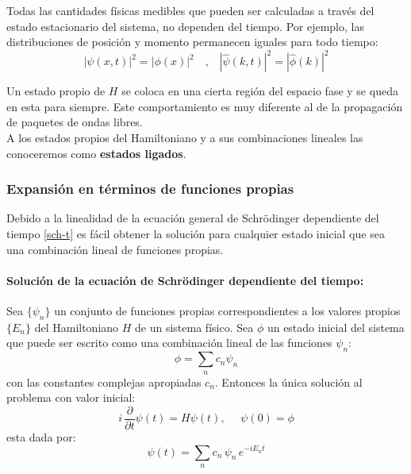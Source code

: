 \documentclass[12pt]{book}
\numberwithin{equation}{chapter}
\begin{document}
\vspace{5 mm}    

Todas las cantidades f\'isicas medibles que pueden ser calculadas a trav\'es del estado estacionario del sistema, no dependen del tiempo. Por ejemplo, las distribuciones de posici\'on y momento permanecen iguales para todo tiempo:
\begin{equation}
|\psi (x,t)|^{2}= |\phi (x)|^{2}  \,\,\,\,\,\,,\,\,\,\,\, |\hat{\psi} (k,t)|^{2}= |\hat{\phi}(k)|^{2}
\end{equation}

Un estado propio de $H$ se coloca en una cierta regi\'on del espacio fase y se queda en esta para siempre. Este comportamiento es muy diferente al de la propagaci\'on de paquetes de ondas libres.\\
A los estados propios del Hamiltoniano y a sus combinaciones lineales las conoceremos como {\bf estados ligados}.

\subsubsection{Expansi\'on en t\'erminos de funciones propias}
Debido a la linealidad de la ecuaci\'on general de Schr\"odinger dependiente del tiempo \eqref{sch-t} es f\'acil obtener la soluci\'on para cualquier estado inicial que sea una combinaci\'on lineal de funciones propias.

\paragraph{Soluci\'on de la ecuaci\'on de Schr\"odinger dependiente del tiempo:}  
Sea $\{ \psi_{n} \}$ un conjunto de funciones propias correspondientes a los valores propios $\{ E_{n} \}$ del Hamiltoniano $H$ de un sistema f\'isico. Sea $\phi$ un estado inicial del sistema que puede ser escrito como una combinaci\'on lineal de las funciones $\psi_{n}$:
\begin{equation}
\phi = \sum_{n} c_{n} \psi_{n}
\end{equation}
con las constantes complejas apropiadas $c_{n}$. Entonces la \'unica soluci\'on al problema con valor inicial:
\begin{equation}
i\, \frac{\partial}{\partial t} \psi (t)= H \psi (t) ,\,\,\,\,\,\,\,\, \psi (0)= \phi
\end{equation}
esta dada por:
\begin{equation}
\psi (t)= \sum_{n} c_{n}\, \psi_{n} \, e^{-iE_{n}t}
\end{equation}
\end{document}

